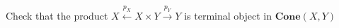 Check that the product $X \xleftarrow{p_X} X \times Y \xrightarrow{p_Y} Y$ is terminal object in $\mathbf{Cone}(X,Y)$
